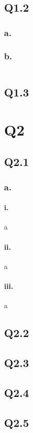 \documentclass[a4paper,11pt]{article}
\begin{document}
\subsection{Q1.2}
\subsubsection{a.}
\subsubsection{b.}

\begin{lstlisting}[style = Matlab-editor]
%code here
\end{lstlisting}

\subsection{Q1.3}

 
\section{Q2}
\subsection{Q2.1}
\subsubsection{a.}
\paragraph{i.}
a

\paragraph{ii.}
a
\paragraph{iii.}
a


\newpage
\subsection{Q2.2}

\subsection{Q2.3}

\subsection{Q2.4}

\subsection{Q2.5}
\end{document}
